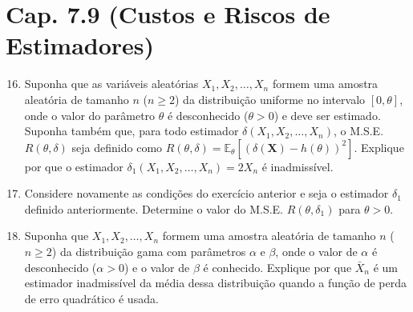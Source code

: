 \documentclass[leqno, 12pt]{article}
\theoremstyle{definition}
\newcommand{\rs}{X_1, X_2, \ldots, X_n} %
\newcommand{\bX}{\boldsymbol{X}} %
\begin{document}
\section*{Cap. 7.9 (Custos e Riscos de Estimadores)}

\begin{enumerate}
\setcounter{enumi}{15}


\item \textbf{\parencite[ex. 2, pág. 460]{DeGroot:2014}} Suponha que as variáveis aleatórias \(\rs\) formem uma amostra aleatória de tamanho \(n\) (\(n \geq 2\)) da distribuição uniforme no intervalo \([0, \theta]\), onde o valor do parâmetro \(\theta\) é desconhecido (\(\theta > 0\)) e deve ser estimado. Suponha também que, para todo estimador \(\delta(\rs)\), o M.S.E. \(R(\theta, \delta)\) seja definido como \(R(\theta, \delta) = \mathbb{E}_\theta[ (\delta(\bX) - h(\theta))^2]\). Explique por que o estimador \(\delta_1(\rs) = 2X_n\) é inadmissível.


\item \textbf{\parencite[ex. 3, pág. 460]{DeGroot:2014}} Considere novamente as condições do exercício anterior e seja o estimador \(\delta_1\)  definido anteriormente. Determine o valor do M.S.E. \(R(\theta, \delta_1)\) para \(\theta > 0\).


\item \textbf{\parencite[ex. 6, pág. 460]{DeGroot:2014}} Suponha que \(\rs\) formem uma amostra aleatória de tamanho \(n\) (\(n \geq 2\)) da distribuição gama com parâmetros \(\alpha\) e \(\beta\), onde o valor de \(\alpha\) é desconhecido (\(\alpha > 0\)) e o valor de \(\beta\) é conhecido. Explique por que \(\bar X_n\) é um estimador inadmissível da média dessa distribuição quando a função de perda de erro quadrático é usada.



\end{enumerate}
\end{document}
